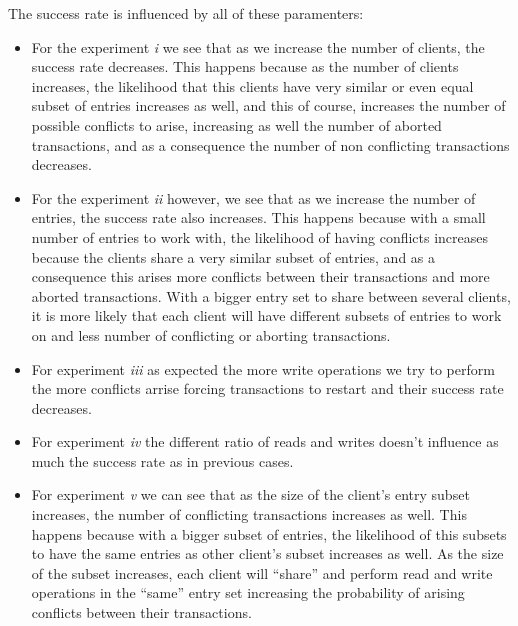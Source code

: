 \documentclass[a4paper, 11pt]{article}
\begin{document}
The success rate is influenced by all of these paramenters:\\
\begin{itemize}
\item For the experiment \textit{i} we see that as we increase the number of clients, the success rate decreases. This happens because as the number of clients increases, the likelihood that this clients have very similar or even equal subset of entries increases as well, and this of course, increases the number of possible conflicts to arise, increasing as well the number of aborted transactions, and as a consequence the number of non conflicting transactions decreases.\\

\item For the experiment \textit{ii} however, we see that as we increase the number of entries, the success rate also increases. This happens because with a small number of entries to work with, the likelihood of having conflicts increases because the clients share a very similar subset of entries, and as a consequence this arises more conflicts between their transactions and more aborted transactions. With a bigger entry set to share between several clients, it is more likely that each client will have different subsets of entries to work on and less number of conflicting or aborting transactions.\\

\item For experiment \textit{iii} as expected the more write operations we try to perform the more conflicts arrise forcing transactions to restart and their success rate decreases.\\

\item For experiment \textit{iv} the different ratio of reads and writes doesn't influence as much the success rate as in previous cases.\\

\item For experiment \textit{v} we can see that as the size of the client's entry subset increases, the number of conflicting transactions increases as well. This happens because with a bigger subset of entries, the likelihood of this subsets to have the same entries as other client's subset increases as well. As the size of the subset increases, each client will ``share'' and perform read and write operations in the ``same'' entry set increasing the probability of arising conflicts between their transactions.\\

\end{itemize}
\end{document}
